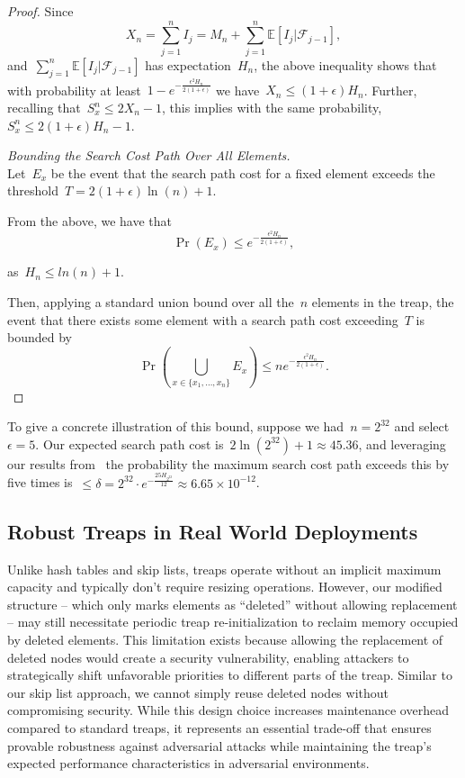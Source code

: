 \begin{proof}
Since
$$X_n = \sum_{j=1}^{n} I_j = M_n + \sum_{j=1}^{n} \mathbb{E}[I_j | \mathcal{F}_{j-1}],$$
and~$\sum_{j=1}^{n} \mathbb{E}[I_j | \mathcal{F}_{j-1}]$ has expectation~$H_n$, the above inequality shows that with probability at least~$1 - e^{-\frac{\epsilon^2 H_{n}}{2(1 + \epsilon)}}$ we have~$X_n \leq (1+ \epsilon)H_n$. Further, recalling that~$S^{n}_{x} \leq 2X_n -1$, this implies with the same probability, $S^{n}_{x} \leq 2(1+\epsilon)H_n-1$.

\textit{Bounding the Search Cost Path Over All Elements.} \\

Let~$E_x$ be the event that the search path cost for a fixed element exceeds the threshold~$T = 2(1+\epsilon) \ln(n) + 1$. 

From the above, we have that
$$ \Pr(E_x) \leq e^{-\frac{\epsilon^2 H_{n}}{2(1 + \epsilon)}},$$

as~$H_n \leq ln(n) + 1$.

Then, applying a standard union bound over all the~$n$ elements in the treap, the event that there exists some element with a search path cost exceeding~$T$ is bounded by 
$$\Pr \left(\bigcup_{x \in \{x_1,\ldots,x_n \}} E_x  \right) \leq n e^{-\frac{\epsilon^2 H_{n}}{2(1 + \epsilon)}}.$$
\end{proof}

To give a concrete illustration of this bound, suppose we had~$n = 2^{32}$ and select~$\epsilon = 5$. Our expected search path cost is~$2 \ln(2^{32}) + 1 \approx 45.36$, and leveraging our results from~ the probability the maximum search cost path exceeds this by five times is~$\leq \delta = 2^{32} \cdot e^{-\frac{25 H_{2^{32}}}{12}} \approx 6.65 \times 10^{-12}$.

\subsection{Robust Treaps in Real World Deployments}

Unlike hash tables and skip lists, treaps operate without an implicit maximum capacity and typically don't require resizing operations. However, our modified structure -- which only marks elements as ``deleted'' without allowing replacement -- may still necessitate periodic treap re-initialization to reclaim memory occupied by deleted elements. This limitation exists because allowing the replacement of deleted nodes would create a security vulnerability, enabling attackers to strategically shift unfavorable priorities to different parts of the treap. Similar to our skip list approach, we cannot simply reuse deleted nodes without compromising security. While this design choice increases maintenance overhead compared to standard treaps, it represents an essential trade-off that ensures provable robustness against adversarial attacks while maintaining the treap's expected performance characteristics in adversarial environments.